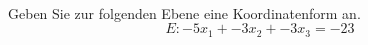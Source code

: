 \begin{aufgabe} ~ \\ 
Geben Sie zur folgenden Ebene eine Koordinatenform an.\[E: -5x_1 + -3x_2 + -3x_3 = -23\]\end{aufgabe} 
